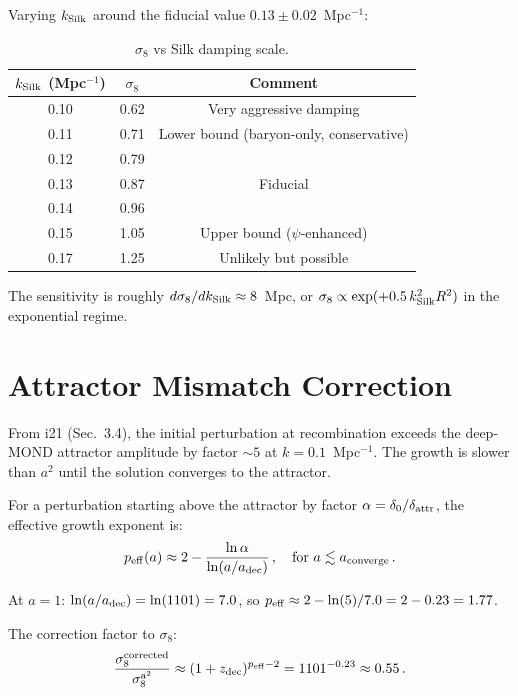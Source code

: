 \documentclass[11pt]{article}
\newcommand{\kSilk}{k_{\rm Silk}}
\begin{document}
Varying $\kSilk$ around the fiducial value $0.13 \pm 0.02$~Mpc$^{-1}$:

\begin{table}[H]
\centering
\caption{$\sigma_8$ vs Silk damping scale.}
\begin{tabular}{ccc}
\toprule
$\kSilk$ (Mpc$^{-1}$) & $\sigma_8$ & Comment \\
\midrule
0.10 & 0.62 & Very aggressive damping \\
0.11 & 0.71 & Lower bound (baryon-only, conservative) \\
0.12 & 0.79 & \\
0.13 & 0.87 & Fiducial \\
0.14 & 0.96 & \\
0.15 & 1.05 & Upper bound ($\psi$-enhanced) \\
0.17 & 1.25 & Unlikely but possible \\
\bottomrule
\end{tabular}
\end{table}

The sensitivity is roughly $d\sigma_8/d\kSilk \approx 8$~Mpc, or
$\sigma_8 \propto \exp(+0.5\,\kSilk^2 R^2)$ in the exponential regime.

\section{Attractor Mismatch Correction}

From i21 (Sec.~3.4), the initial perturbation at recombination exceeds
the deep-MOND attractor amplitude by factor $\sim 5$ at $k = 0.1$~Mpc$^{-1}$.
The growth is slower than $a^2$ until the solution converges to the attractor.

For a perturbation starting above the attractor by factor $\alpha = \delta_0/\delta_{\rm attr}$, the effective growth exponent is:
\begin{equation}
p_{\rm eff}(a) \approx 2 - \frac{\ln\alpha}{\ln(a/a_{\rm dec})}\,,
\quad\text{for } a \lesssim a_{\rm converge}\,.
\end{equation}

At $a = 1$: $\ln(a/a_{\rm dec}) = \ln(1101) = 7.0$, so
$p_{\rm eff} \approx 2 - \ln(5)/7.0 = 2 - 0.23 = 1.77$.

The correction factor to $\sigma_8$:
\begin{equation}
\frac{\sigma_8^{\rm corrected}}{\sigma_8^{\rm a^2}}
\approx (1+z_{\rm dec})^{p_{\rm eff} - 2}
= 1101^{-0.23} \approx 0.55\,.
\end{equation}
\end{document}
